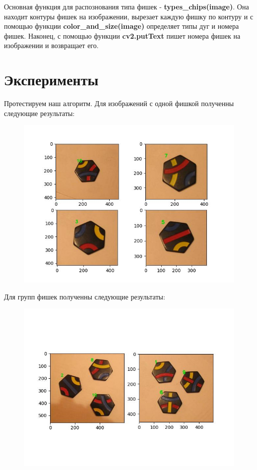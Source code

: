\documentclass[a4paper, 12pt]{article}
\begin{document}
Основная функция для распознования типа фишек - \textbf{types\_chips(image)}. Она находит контуры фишек на изображении, вырезает каждую фишку по контуру и с помощью функции \textbf{color\_and\_size(image)} определяет типы дуг и номера фишек. Наконец, с помощью функции \textbf{cv2.putText} пишет номера фишек на изображении и возвращает его. 



\section{Эксперименты}  
Протестируем наш алгоритм. Для изображений с одной фишкой полученны следующие результаты:

 \begin{figure}[H]
        	\centering
        	\includegraphics[width=1\linewidth]{test_1.jpg}
        	\label{fig:mpr_5}
        	\vspace{-25pt}
        	\caption{}
\end{figure}

Для групп фишек полученны следующие результаты:

 \begin{figure}[H]
        	\centering
        	\includegraphics[width=0.8\linewidth]{test_3.jpg}
        	\label{fig:mpr_6}
        	\vspace{-25pt}
        	\caption{}
\end{figure}
\end{document}
